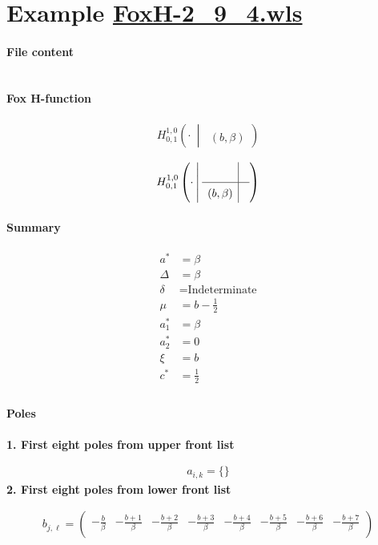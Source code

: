 \documentclass[11pt]{article}
\newcommand{\FoxH}[5]{H_{#2}^{#1}\left(#3\:\middle\vert\: \begin{array}{l}#4\\[0.4em] #5\end{array}\right)}
\begin{document}
\section{Example \url{FoxH-2_9_4.wls}}

\paragraph{File content}

\inputminted{text}{FoxH-2_9_4.wls}

\paragraph{Fox H-function}

\begin{align*}
  \FoxH
    {1,0}
    {0,1}
    {\cdot}
    {}
    {\left(b, \beta\right)}
\end{align*}

\begin{align*}
  \FoxHext
    {1,0}
    {0,1}
    {\cdot}
    {}
    {}
    {\left(b, \beta\right)}
    {}
\end{align*}

\paragraph{Summary}

\begin{align*}
  a^*    & = \beta \\
  \Delta & = \beta \\
  \delta & = \text{Indeterminate} \\
  \mu    & = b-\frac{1}{2} \\
  a_1^*  & = \beta \\
  a_2^*  & = 0 \\
  \xi    & = b \\
  c^*    & = \frac{1}{2} \\
\end{align*}

\paragraph{Poles}

\noindent\textbf{1. First eight poles from upper front list}

\begin{align*}
  a_{i,k} = 
  \{\}
\end{align*}
\noindent\textbf{2. First eight poles from lower front list}

\begin{align*}
  b_{j,\ell} = 
  \left(
\begin{array}{cccccccc}
 -\frac{b}{\beta } & -\frac{b+1}{\beta } & -\frac{b+2}{\beta } & -\frac{b+3}{\beta } & -\frac{b+4}{\beta } & -\frac{b+5}{\beta } & -\frac{b+6}{\beta } & -\frac{b+7}{\beta } \\
\end{array}
\right)
\end{align*}



\printbibliography[title={References}]
\end{document}
